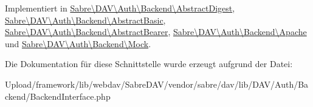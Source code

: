 Implementiert in \mbox{\hyperlink{class_sabre_1_1_d_a_v_1_1_auth_1_1_backend_1_1_abstract_digest_aa91ba2f6ec926db9acf706b30d1b10a2}{Sabre\textbackslash{}\+D\+A\+V\textbackslash{}\+Auth\textbackslash{}\+Backend\textbackslash{}\+Abstract\+Digest}}, \mbox{\hyperlink{class_sabre_1_1_d_a_v_1_1_auth_1_1_backend_1_1_abstract_basic_a1dfc9862b792365d1a3ce06b026fe119}{Sabre\textbackslash{}\+D\+A\+V\textbackslash{}\+Auth\textbackslash{}\+Backend\textbackslash{}\+Abstract\+Basic}}, \mbox{\hyperlink{class_sabre_1_1_d_a_v_1_1_auth_1_1_backend_1_1_abstract_bearer_ac43079a9c47779745f3435cb775da867}{Sabre\textbackslash{}\+D\+A\+V\textbackslash{}\+Auth\textbackslash{}\+Backend\textbackslash{}\+Abstract\+Bearer}}, \mbox{\hyperlink{class_sabre_1_1_d_a_v_1_1_auth_1_1_backend_1_1_apache_ab3d666cc6cc048bd766d26e1a9048cf9}{Sabre\textbackslash{}\+D\+A\+V\textbackslash{}\+Auth\textbackslash{}\+Backend\textbackslash{}\+Apache}} und \mbox{\hyperlink{class_sabre_1_1_d_a_v_1_1_auth_1_1_backend_1_1_mock_af99cedee6ef68eeff7c826d49c7a5b2e}{Sabre\textbackslash{}\+D\+A\+V\textbackslash{}\+Auth\textbackslash{}\+Backend\textbackslash{}\+Mock}}.



Die Dokumentation für diese Schnittstelle wurde erzeugt aufgrund der Datei\+:\begin{DoxyCompactItemize}
\item 
Upload/framework/lib/webdav/\+Sabre\+D\+A\+V/vendor/sabre/dav/lib/\+D\+A\+V/\+Auth/\+Backend/Backend\+Interface.\+php\end{DoxyCompactItemize}

